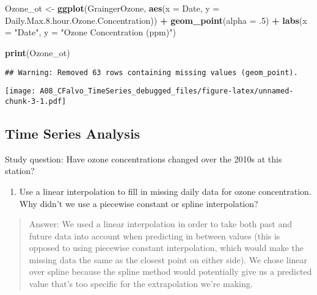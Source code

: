 \documentclass[]{article}
\newenvironment{Shaded}{\begin{snugshade}}{\end{snugshade}}
\newcommand{\DataTypeTok}[1]{\textcolor[rgb]{0.13,0.29,0.53}{#1}}
\newcommand{\FloatTok}[1]{\textcolor[rgb]{0.00,0.00,0.81}{#1}}
\newcommand{\KeywordTok}[1]{\textcolor[rgb]{0.13,0.29,0.53}{\textbf{#1}}}
\newcommand{\NormalTok}[1]{#1}
\newcommand{\OperatorTok}[1]{\textcolor[rgb]{0.81,0.36,0.00}{\textbf{#1}}}
\newcommand{\StringTok}[1]{\textcolor[rgb]{0.31,0.60,0.02}{#1}}
\providecommand{\tightlist}{%
  \setlength{\itemsep}{0pt}\setlength{\parskip}{0pt}}
\begin{document}
\hypertarget{section-2}{%
\section{}\label{section-2}}

\begin{Shaded}
\begin{Highlighting}[]
\NormalTok{Ozone_ot <-}
\StringTok{   }\KeywordTok{ggplot}\NormalTok{(GraingerOzone, }\KeywordTok{aes}\NormalTok{(}\DataTypeTok{x =}\NormalTok{ Date, }\DataTypeTok{y =}\NormalTok{ Daily.Max.}\FloatTok{8.}\NormalTok{hour.Ozone.Concentration)) }\OperatorTok{+}
\StringTok{   }\KeywordTok{geom_point}\NormalTok{(}\DataTypeTok{alpha =} \FloatTok{.5}\NormalTok{) }\OperatorTok{+}
\StringTok{   }\KeywordTok{labs}\NormalTok{(}\DataTypeTok{x =} \StringTok{"Date"}\NormalTok{, }\DataTypeTok{y =} \StringTok{"Ozone Concentration (ppm)"}\NormalTok{)}

 \KeywordTok{print}\NormalTok{(Ozone_ot)}
\end{Highlighting}
\end{Shaded}

\begin{verbatim}
## Warning: Removed 63 rows containing missing values (geom_point).
\end{verbatim}

\texttt{[image: A08\_CFalvo\_TimeSeries\_debugged\_files/figure-latex/unnamed-chunk-3-1.pdf]}

\hypertarget{time-series-analysis}{%
\subsection{Time Series Analysis}\label{time-series-analysis}}

Study question: Have ozone concentrations changed over the 2010s at this
station?

\begin{enumerate}
\def\labelenumi{\arabic{enumi}.}
\setcounter{enumi}{7}
\tightlist
\item
  Use a linear interpolation to fill in missing daily data for ozone
  concentration. Why didn't we use a piecewise constant or spline
  interpolation?
\end{enumerate}

\begin{quote}
Answer: We used a linear interpolation in order to take both past and
future data into account when predicting in between values (this is
opposed to using piecewise constant interpolation, which would make the
missing data the same as the closest point on either side). We chose
linear over spline because the spline method would potentially give us a
predicted value that's too specific for the extrapolation we're making.
\end{quote}
\end{document}

